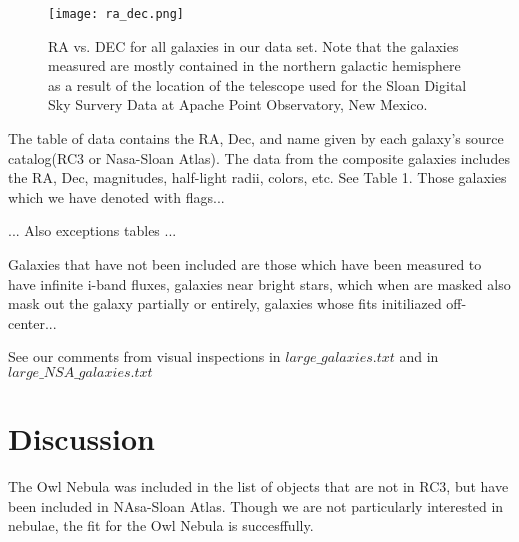 \documentclass[12pt,preprint,dvipdf]{aastex}
\begin{document}
\begin{figure}
\centering
\texttt{[image: ra\_dec.png]}
\caption{RA vs. DEC for all galaxies in our data set. Note that the galaxies measured are mostly contained in the northern galactic hemisphere as a result of the location of the telescope used for the Sloan Digital Sky Survery Data at Apache Point Observatory, New Mexico.}
\end{figure}


The table of data contains the RA, Dec, and name given by each galaxy's source catalog(RC3 or Nasa-Sloan Atlas). The data from the composite galaxies includes the RA, Dec, magnitudes, half-light radii, colors, etc. See Table 1. Those galaxies which we have denoted with flags... 


... Also exceptions tables ...


Galaxies that have not been included are those which have been measured to have infinite i-band fluxes, galaxies near bright stars, which when are masked also mask out the galaxy partially or entirely, galaxies whose fits initiliazed off-center...

See our comments from visual inspections in $large\_galaxies.txt$ and in $large\_NSA\_galaxies.txt$

\section{Discussion}

The Owl Nebula was included in the list of objects that are not in RC3, but have been included in NAsa-Sloan Atlas. Though we are not particularly interested in nebulae, the fit for the Owl Nebula is succesffully.
\end{document}
